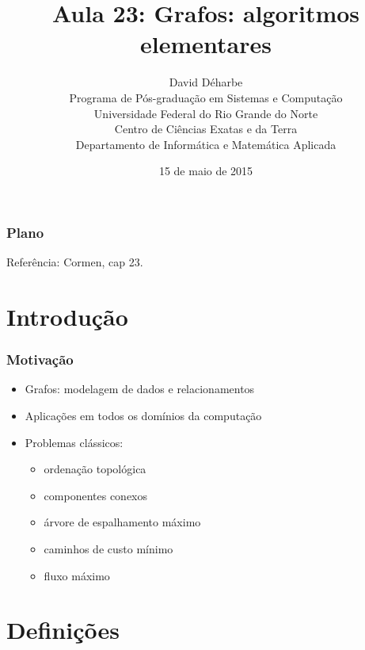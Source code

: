 \documentclass{beamer}
\title{Aula 23: Grafos: algoritmos elementares}
\author{David Déharbe \\
  Programa de Pós-graduação em Sistemas e Computação \\
  Universidade Federal do Rio Grande do Norte \\
  Centro de Ciências Exatas e da Terra \\
  Departamento de Informática e Matemática Aplicada}
\date{15 de maio de 2015}
\begin{document}

\begin{frame}
  \titlepage
\end{frame}

\begin{frame}
  \frametitle{Plano}
  \tableofcontents

Referência: Cormen, cap 23.
\end{frame}

\section{Introdução}

\begin{frame}
\frametitle{Motivação}

\begin{itemize}
\item Grafos: modelagem de dados e relacionamentos 
\item Aplicações em todos os domínios da computação
\item Problemas clássicos: 
\begin{itemize}
\item ordenação topológica
\item componentes conexos
\item árvore de espalhamento máximo
\item caminhos de custo mínimo 
\item fluxo máximo
\end{itemize}
\end{itemize}
\end{frame}

\section{Definições}
\end{document}

